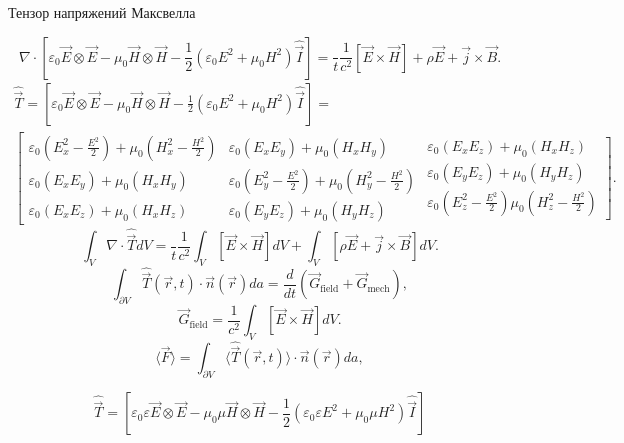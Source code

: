 \documentclass[9pt, compress, xcolor=table]{beamer}
\begin{document}
\begin{frame}{Тензор напряжений Максвелла}

{\scriptsize
\begin{equation*}
\nabla\cdot\left[\varepsilon_0\vec  E\otimes\vec  E-\mu_0\vec  H\otimes\vec  H-\frac{1}{2}\left(\varepsilon_0E^2+\mu_0H^2\right)\hat{\vec  I}\right]=\dfrac{}{t}\frac{1}{c^2}[\vec  E\times\vec  H]+\rho\vec  E+\vec  j\times \vec  B.
\end{equation*}
\begin{multline*}
\hat{\vec  T}=\left[\varepsilon_0\vec  E\otimes\vec  E-\mu_0\vec  H\otimes\vec  H-\frac{1}{2}\left(\varepsilon_0E^2+\mu_0H^2\right)\hat{\vec  I}\right]=\\
\left[
\begin{array}{cc}
\varepsilon_0\left(E_x^2{-}\frac{E^2}{2}\right) + \mu_0\left(H_x^2{-}\frac{H^2}{2}\right)&  \varepsilon_0(E_x E_y) +\mu_0(H_x H_y) \\
\varepsilon_0(E_x E_y) + \mu_0(H_x H_y)&  \varepsilon_0\left(E_y^2{-}\frac{E^2}{2}\right) +\mu_0\left(H_y^2{-}\frac{H^2}{2}\right)\\
\varepsilon_0(E_x E_z) + \mu_0(H_x H_z)&  \varepsilon_0(E_y E_z) + \mu_0(H_y H_z)
\end{array}
\right.
\left.
\begin{array}{c}
\varepsilon_0(E_x E_z) + \mu_0(H_x H_z)\\
\varepsilon_0(E_y E_z) + \mu_0(H_y H_z)\\
\varepsilon_0\left(E_z^2{-}\frac{E^2}{2}\right)  \mu_0\left(H_z^2{-}\frac{H^2}{2}\right)
\end{array}
\right].
\end{multline*}
\begin{equation*}
\int_V\nabla\cdot\hat{\vec  T}dV=\dfrac{}{t}\frac{1}{c^2}\int_V[\vec  E\times\vec  H]dV+\int_V[\rho\vec  E+\vec  j\times\vec  B]dV.
\end{equation*}
\begin{equation*}
\boxed{
\int_{\partial V}\hat{\vec  T}(\vec  r,t)\cdot\vec  n(\vec  r) da=
\frac{d}{dt}\left(\vec  G_{\text{field}}+\vec  G_{\text{mech}}\right),
}
\end{equation*}
}
\begin{equation*}
\vec  G_{\text{field}}=\frac{1}{c^2}\int_V[\vec  E\times\vec  H]dV.
\end{equation*}
\begin{equation*}
\langle\vec  F\rangle=\int_{\partial V}\langle\hat{\vec  T}(\vec  r,t)\rangle\cdot\vec  n(\vec  r) da,
\end{equation*}

\begin{equation*}
\boxed{
\hat{\vec  T}=\left[\varepsilon_0\varepsilon\vec  E\otimes\vec  E-\mu_0\mu\vec  H\otimes\vec  H-\frac{1}{2}\left(\varepsilon_0\varepsilon E^2+\mu_0\mu H^2\right)\hat{\vec  I}\right]
}
\end{equation*}
\end{frame}
\end{document}
